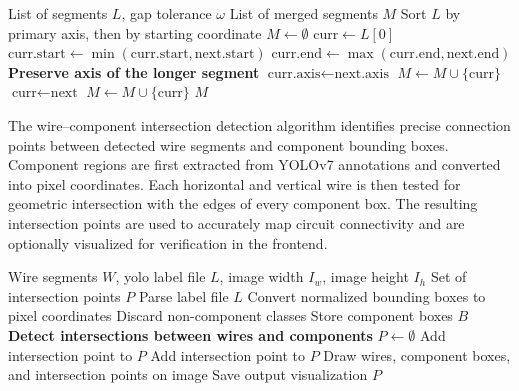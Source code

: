 \begin{algorithm}
\caption{Collinear Segment Merging}
\label{algo:segment-merging-impl}
\begin{algorithmic}
\Require List of segments $L$, gap tolerance $\omega$
\Ensure List of merged segments $M$
\State Sort $L$ by primary axis, then by starting coordinate
\State $M \leftarrow \emptyset$
\State $\text{curr} \leftarrow L[0]$
        \State $\text{curr.start} \leftarrow \min(\text{curr.start}, \text{next.start})$
        \State $\text{curr.end} \leftarrow \max(\text{curr.end}, \text{next.end})$
            \State \textbf{Preserve axis of the longer segment}
            \State $\text{curr.axis} \leftarrow \text{next.axis}$
        \EndIf
    \Else
        \State $M \leftarrow M \cup \{\text{curr}\}$
        \State $\text{curr} \leftarrow \text{next}$
    \EndIf
\EndFor
\State $M \leftarrow M \cup \{\text{curr}\}$
\State \Return $M$
\end{algorithmic}
\end{algorithm}

The wire–component intersection detection algorithm identifies precise connection points between detected wire segments and component bounding boxes. Component regions are first extracted from YOLOv7 annotations and converted into pixel coordinates. Each horizontal and vertical wire is then tested for geometric intersection with the edges of every component box. The resulting intersection points are used to accurately map circuit connectivity and are optionally visualized for verification in the frontend.

\begin{algorithm}
\caption{Wire–Component Intersection Detection}
\label{algo:wire-component-intersection-impl}
\begin{algorithmic}
\Require Wire segments $W$, \gls{yolo} label file $L$, image width $I_w$, image height $I_h$
\Ensure Set of intersection points $P$
\State Parse label file $L$
\State Convert normalized bounding boxes to pixel coordinates
\State Discard non-component classes
\State Store component boxes $B$
\State \textbf{Detect intersections between wires and components}
\State $P \leftarrow \emptyset$
            \State Add intersection point to $P$
            \State Add intersection point to $P$
        \EndIf
    \EndFor
\EndFor
\State Draw wires, component boxes, and intersection points on image
\State Save output visualization
\State \Return $P$
\end{algorithmic}
\end{algorithm}

